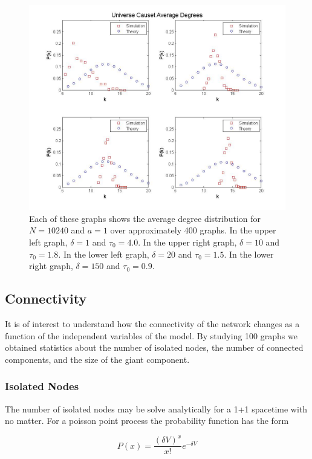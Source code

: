 \documentclass[preprint,notitlepage,amsmath,amssymb,floatfix]{revtex4-1}
\begin{document}
\begin{figure}
\includegraphics[width=18cm]{figures/avg_degrees.jpg}
\caption{Each of these graphs shows the average degree distribution for $N = 10240$ and $a = 1$ over approximately 400 graphs.  In the upper left graph, $\delta = 1$ and $\tau_0 = 4.0$.  In the upper right graph, $\delta = 10$ and $\tau_0 = 1.8$.  In the lower left graph, $\delta = 20$ and $\tau_0 = 1.5$.  In the lower right graph, $\delta = 150$ and $\tau_0 = 0.9$.}
\label{fig:avg_deg_uni}
\centering
\end{figure}

\subsection{Connectivity}
It is of interest to understand how the connectivity of the network changes as a function of the independent variables of the model.
By studying 100 graphs we obtained statistics about the number of isolated nodes, the number of connected components, and the size of the giant component.
\subsubsection{Isolated Nodes}
The number of isolated nodes may be solve analytically for a 1+1 spacetime with no matter.  For a poisson point process the probability function has the form

\begin{equation}
P(x) = \frac{\left(\delta V\right)^x}{x!}e^{-\delta V}
\end{equation}
\end{document}
